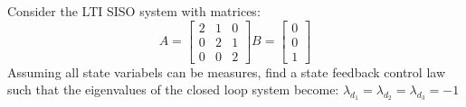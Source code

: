 \item Consider the LTI SISO system with matrices:
  \begin{equation}
    A =
    \begin{bmatrix}
      2 & 1 & 0 \\
      0 & 2 & 1 \\
      0 & 0 & 2
    \end{bmatrix}
    B =
    \begin{bmatrix}
      0 \\
      0 \\
      1
    \end{bmatrix}
  \end{equation}
  Assuming all state variabels can be measures, find a state feedback control law such that the eigenvalues
  of the closed loop system become: $\lambda_{d_1} = \lambda_{d_2} = \lambda_{d_3} = -1$

